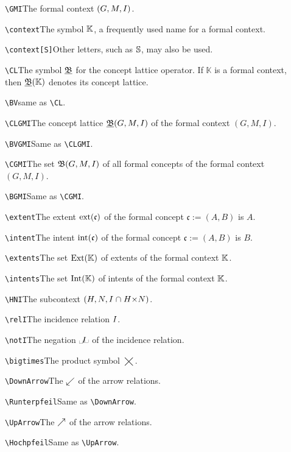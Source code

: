 \documentclass[12pt]{article}
\begin{document}
\begin{description}
\item[]\verb|\GMI|\quad The formal context $\GMI$. 
\item[]\verb|\context|\quad The symbol $\context$, a frequently used name for
  a formal context.
\item[]\verb|\context[S]|\quad Other letters, such as $\context[S]$, may also
  be used. 
\item[]\verb|\CL|\quad The symbol $\CL$ for the concept lattice operator. If
  ${\mathbb K}$ is a formal context, then $\CL({\mathbb K})$ denotes its
  concept lattice.   
\item[]\verb|\BV|\quad same as \verb|\CL|.  
\item[]\verb|\CLGMI|\quad The concept lattice $\CLGMI$ of the formal context
  $(G,M,I)$.   
\item[]\verb|\BVGMI|\quad Same as \verb|\CLGMI|.  
\item[]\verb|\CGMI|\quad The set $\CGMI$ of all formal concepts of the formal
  context   $(G,M,I)$.   
\item[]\verb|\BGMI|\quad Same as \verb|\CGMI|.  
\item[]\verb|\extent|\quad The extent $\extent{\mathfrak{c}}$ of the formal
  concept $\mathfrak{c}:=(A,B)$ is  $A$. 
\item[]\verb|\intent|\quad The intent $\intent{\mathfrak{c}}$ of the formal
  concept $\mathfrak{c}:=(A,B)$ is  $B$. 
\item[]\verb|\extents|\quad The set $\extents{\context}$ of extents of the
  formal context $\context$.  
\item[]\verb|\intents|\quad The set $\intents{\context}$ of intents of the
  formal context $\context$.  
\item[]\verb|\HNI|\quad The subcontext $\HNI$.  
\item[]\verb|\relI|\quad The incidence relation $\relI$.  
\item[]\verb|\notI|\quad The negation $\notI$ of the incidence
  relation.  
\item[]\verb|\bigtimes|\quad The product symbol $\bigtimes$.
\item[]\verb|\DownArrow|\quad The $\Runterpfeil$ of the arrow relations.  
\item[]\verb|\Runterpfeil|\quad Same as \verb|\DownArrow|. 
\item[]\verb|\UpArrow|\quad The $\Hochpfeil$ of the arrow relations.
\item[]\verb|\Hochpfeil|\quad   Same as \verb|\UpArrow|.

\end{description}
\end{document}
